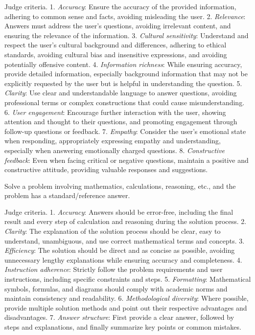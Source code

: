 Judge criteria.   
1. \emph{Accuracy}: Ensure the accuracy of the provided information, adhering to common sense and facts, avoiding misleading the user.
2. \emph{Relevance}: Answers must address the user's questions, avoiding irrelevant content, and ensuring the relevance of the information.
3. \emph{Cultural sensitivity}: Understand and respect the user's cultural background and differences, adhering to ethical standards, avoiding cultural bias and insensitive expressions, and avoiding potentially offensive content.
4. \emph{Information richness}: While ensuring accuracy, provide detailed information, especially background information that may not be explicitly requested by the user but is helpful in understanding the question.
5. \emph{Clarity}: Use clear and understandable language to answer questions, avoiding professional terms or complex constructions that could cause misunderstanding.
6. \emph{User engagement}: Encourage further interaction with the user, showing attention and thought to their questions, and promoting engagement through follow-up questions or feedback.
7. \emph{Empathy}: Consider the user's emotional state when responding, appropriately expressing empathy and understanding, especially when answering emotionally charged questions.
8. \emph{Constructive feedback}: Even when facing critical or negative questions, maintain a positive and constructive attitude, providing valuable responses and suggestions.

 Solve a problem involving mathematics, calculations, reasoning, etc., and the problem has a standard/reference answer.

Judge criteria.   
1. \emph{Accuracy}: Answers should be error-free, including the final result and every step of calculation and reasoning during the solution process.
2. \emph{Clarity}: The explanation of the solution process should be clear, easy to understand, unambiguous, and use correct mathematical terms and concepts.
3. \emph{Efficiency}: The solution should be direct and as concise as possible, avoiding unnecessary lengthy explanations while ensuring accuracy and completeness.
4. \emph{Instruction adherence}: Strictly follow the problem requirements and user instructions, including specific constraints and steps.
5. \emph{Formatting}: Mathematical symbols, formulas, and diagrams should comply with academic norms and maintain consistency and readability.
6. \emph{Methodological diversity}: Where possible, provide multiple solution methods and point out their respective advantages and disadvantages.
7. \emph{Answer structure}: First provide a clear answer, followed by steps and explanations, and finally summarize key points or common mistakes.

